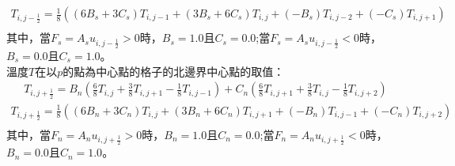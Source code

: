 \documentclass[12pt]{article}
\begin{document}
\begin{equation}
\begin{split}
  T_{i,j-\frac{1}{2}} = \frac{1}{8}\left((6B_{s}+3C_{s})T_{i,j-1}+(3B_{s}+6C_{s})T_{i,j}+(-B_{s})T_{i,j-2}+(-C_{s})T_{i,j+1}\right)\\
\end{split}
\end{equation}
\noindent 其中，當$F_{s} = A_{s}u_{i,j-\frac{1}{2}}>0$時，$B_{s} = 1.0$且$C_{s} = 0.0$;當$F_{s} = A_{s}u_{i,j-\frac{1}{2}}<0$時，$B_{s} = 0.0$且$C_{s} = 1.0$。\\
\noindent 溫度$T$在以$p$的點為中心點的格子的北邊界中心點的取值：
\begin{equation}
\begin{split}
  T_{i,j+\frac{1}{2}} = B_{n}(\frac{6}{8}T_{i,j}+\frac{3}{8}T_{i,j+1}-\frac{1}{8}T_{i,j-1})+C_{n}(\frac{6}{8}T_{i,j+1}+\frac{3}{8}T_{i,j}-\frac{1}{8}T_{i,j+2})
\end{split}
\end{equation}
\begin{equation}
\begin{split}
  T_{i,j+\frac{1}{2}} = \frac{1}{8}\left((6B_{n}+3C_{n})T_{i,j}+(3B_{n}+6C_{n})T_{i,j+1}+(-B_{n})T_{i,j-1}+(-C_{n})T_{i,j+2}\right)\\
\end{split}
\end{equation}
\noindent 其中，當$F_{n} = A_{n}u_{i,j+\frac{1}{2}}>0$時，$B_{n} = 1.0$且$C_{n} = 0.0$;當$F_{n} = A_{n}u_{i,j+\frac{1}{2}}<0$時，$B_{n} = 0.0$且$C_{n} = 1.0$。\\
\end{document}
